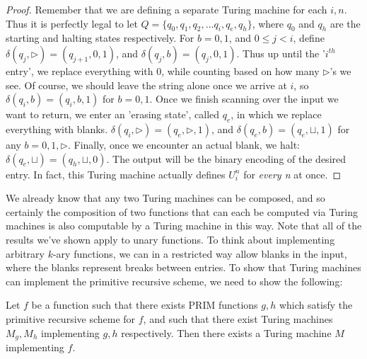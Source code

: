 \begin{proof}
    Remember that we are defining a separate Turing machine for each $i,n$. Thus it is perfectly legal to let $Q=\{q_0,q_1,q_2,...q_i,q_e,q_h\}$, where $q_0$ and $q_h$ are the starting and halting states respectively. For $b=0,1$, and $0 \leq j < i$, define $\delta(q_j,\triangleright)=(q_{j+1},0,1)$, and $\delta(q_j,b)=(q_j,0,1)$. Thus up until the '$i^{th}$ entry', we replace everything with 0, while counting based on how many $\triangleright$'s we see. Of course, we should leave the string alone once we arrive at $i$, so $\delta(q_i,b)=(q_i,b,1)$ for $b=0,1$. Once we finish scanning over the input we want to return, we enter an 'erasing state', called $q_e$, in which we replace everything with blanks. $\delta(q_i,\triangleright)=(q_e,\triangleright,1)$, and $\delta(q_e,b)=(q_e,\sqcup,1)$ for any $b=0,1,\triangleright$. Finally, once we encounter an actual blank, we halt: $\delta(q_e,\sqcup)=(q_h,\sqcup,0)$. The output will be the binary encoding of the desired entry. In fact, this Turing machine actually defines $U_i^n$ for \textit{every n} at once.
\end{proof}
We already know that any two Turing machines can be composed, and so certainly the composition of two functions that can each be computed via Turing machines is also computable by a Turing machine in this way.
Note that all of the results we've shown apply to unary functions. To think about implementing arbitrary $k$-ary functions, we can in a restricted way allow blanks in the input, where the blanks represent breaks between entries. To show that Turing machines can implement the primitive recursive scheme, we need to show the following:
\begin{lemma}
    Let $f$ be a function such that there exists PRIM functions $g,h$ which satisfy the primitive recursive scheme for $f$, and such that there exist Turing machines $M_g,M_h$ implementing $g,h$ respectively. Then there exists a Turing machine $M$ implementing $f$.
\end{lemma}
